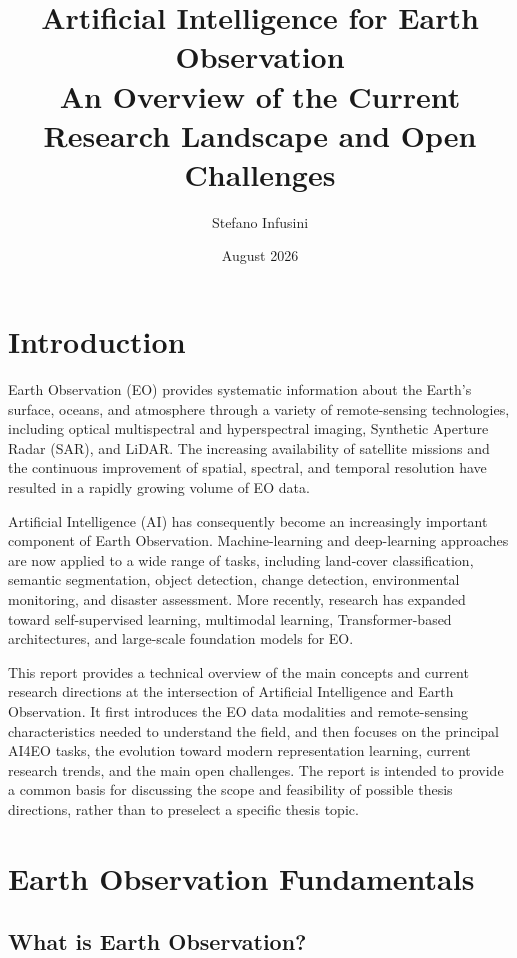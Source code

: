 \documentclass[11pt,a4paper]{article}
\title{
    \textbf{Artificial Intelligence for Earth Observation}\\
    \vspace{0.3cm}
    \large An Overview of the Current Research Landscape and Open Challenges
}
\author{Stefano Infusini}
\date{August 2026}
\begin{document}
\maketitle

\tableofcontents

\newpage

\section{Introduction}

Earth Observation (EO) provides systematic information about the Earth's surface, oceans, and atmosphere through a variety of remote-sensing technologies, including optical multispectral and hyperspectral imaging, Synthetic Aperture Radar (SAR), and LiDAR. The increasing availability of satellite missions and the continuous improvement of spatial, spectral, and temporal resolution have resulted in a rapidly growing volume of EO data.

Artificial Intelligence (AI) has consequently become an increasingly important component of Earth Observation. Machine-learning and deep-learning approaches are now applied to a wide range of tasks, including land-cover classification, semantic segmentation, object detection, change detection, environmental monitoring, and disaster assessment. More recently, research has expanded toward self-supervised learning, multimodal learning, Transformer-based architectures, and large-scale foundation models for EO.

This report provides a technical overview of the main concepts and current research directions at the intersection of Artificial Intelligence and Earth Observation. It first introduces the EO data modalities and remote-sensing characteristics needed to understand the field, and then focuses on the principal AI4EO tasks, the evolution toward modern representation learning, current research trends, and the main open challenges. The report is intended to provide a common basis for discussing the scope and feasibility of possible thesis directions, rather than to preselect a specific thesis topic.


\section{Earth Observation Fundamentals}

\subsection{What is Earth Observation?}
\end{document}
